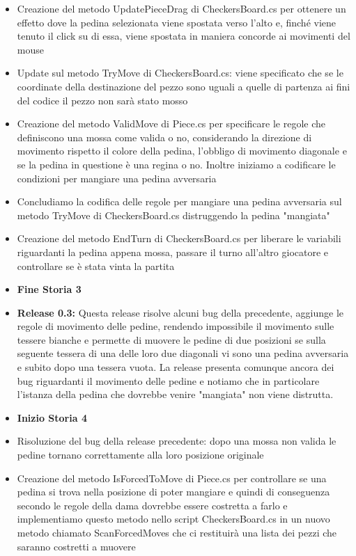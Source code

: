 \documentclass[12pt]{article}
\begin{document}
\begin{itemize}
\begin{itemize}
	\item Creazione del metodo UpdatePieceDrag di CheckersBoard.cs per ottenere un effetto dove la pedina selezionata viene spostata verso l'alto e, finché viene tenuto il click su di essa, viene spostata in maniera concorde ai movimenti del mouse
	\item Update sul metodo TryMove di CheckersBoard.cs: viene specificato che se le coordinate della destinazione del pezzo sono uguali a quelle di partenza ai fini del codice il pezzo non sarà stato mosso
	\item Creazione del metodo ValidMove di Piece.cs per specificare le regole che definiscono una mossa come valida o no, considerando la direzione di movimento rispetto il colore della pedina, l'obbligo di movimento diagonale e se la pedina in questione è una regina o no. Inoltre iniziamo a codificare le condizioni per mangiare una pedina avversaria
	\item Concludiamo la codifica delle regole per mangiare una pedina avversaria sul metodo TryMove di CheckersBoard.cs distruggendo la pedina "mangiata"
	\item Creazione del metodo EndTurn di CheckersBoard.cs per liberare le variabili riguardanti la pedina appena mossa, passare il turno all'altro giocatore e controllare se è stata vinta la partita
	\item \textbf{Fine Storia 3}
	\item \textbf{Release 0.3:} Questa release risolve alcuni bug della precedente, aggiunge le regole di movimento delle pedine, rendendo impossibile il movimento sulle tessere bianche e permette di muovere le pedine di due posizioni se sulla seguente tessera di una delle loro due diagonali vi sono una pedina avversaria e subito dopo una tessera vuota. La release presenta comunque ancora dei bug riguardanti il movimento delle pedine e notiamo che in particolare l'istanza della pedina che dovrebbe venire "mangiata" non viene distrutta.
	\item \textbf{Inizio Storia 4}
	\item Risoluzione del bug della release precedente: dopo una mossa non valida le pedine tornano correttamente alla loro posizione originale
	\item Creazione del metodo IsForcedToMove di Piece.cs per controllare se una pedina si trova nella posizione di poter mangiare e quindi di conseguenza secondo le regole della dama dovrebbe essere costretta a farlo e implementiamo questo metodo nello script CheckersBoard.cs in un nuovo metodo chiamato ScanForcedMoves che ci restituirà una lista dei pezzi che saranno costretti a muovere

\end{itemize}
\end{itemize}
\end{document}
